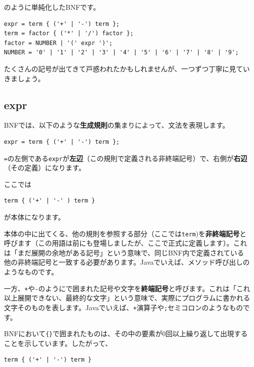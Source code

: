 のように単純化したBNFです。

\begin{verbatim}
expr = term { ('+' | '-') term };
term = factor { ('*' | '/') factor };
factor = NUMBER | '(' expr ')';
NUMBER = '0' | '1' | '2' | '3' | '4' | '5' | '6' | '7' | '8' | '9';
\end{verbatim}

たくさんの記号が出てきて戸惑われたかもしれませんが、一つずつ丁寧に見ていきましょう。

\hypertarget{chapter2-expr}{%
\subsection{expr}\label{chapter2-expr}}

BNFでは、以下のような\textbf{生成規則}の集まりによって、文法を表現します。

\begin{verbatim}
expr = term { ('+' | '-') term };
\end{verbatim}

\texttt{=}の左側である\texttt{expr}が\textbf{左辺}（この規則で定義される非終端記号）で、右側が\textbf{右辺}（その定義）になります。

ここでは

\begin{verbatim}
term { ('+' | '-' ) term }
\end{verbatim}

が本体になります。

本体の中に出てくる、他の規則を参照する部分（ここでは\texttt{term})を\textbf{非終端記号}と呼びます（この用語は前にも登場しましたが、ここで正式に定義します）。これは「まだ展開の余地がある記号」という意味で、同じBNF内で定義されている他の非終端記号と一致する必要があります。Javaでいえば、メソッド呼び出しのようなものです。

一方、\texttt{\textquotesingle{}+\textquotesingle{}}や\texttt{\textquotesingle{}-\textquotesingle{}}のように\texttt{\textquotesingle{}}で囲まれた記号や文字を\textbf{終端記号}と呼びます。これは「これ以上展開できない、最終的な文字」という意味で、実際にプログラムに書かれる文字そのものを表します。Javaでいえば、\texttt{+}演算子や\texttt{;}セミコロンのようなものです。

BNFにおいて\texttt{\{\}}で囲まれたものは、その中の要素が0回以上繰り返して出現することを示しています。したがって、

\begin{verbatim}
term { ('+' | '-') term }
\end{verbatim}

